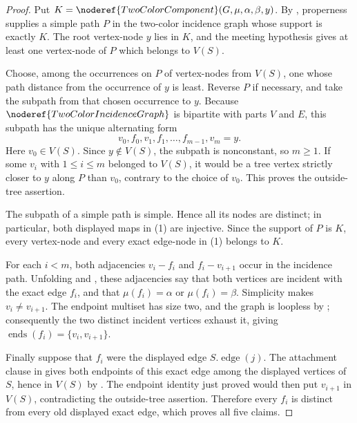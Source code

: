 \begin{proof}
Put
\(K=\noderef{TwoColorComponent}(G,\mu,\alpha,\beta,y)\).  By
, properness supplies a simple path
\(P\) in the two-color incidence graph whose support is exactly \(K\).
The root vertex-node \(y\) lies in \(K\), and the meeting hypothesis gives
at least one vertex-node of \(P\) which belongs to \(V(S)\).

Choose, among the occurrences on \(P\) of vertex-nodes from \(V(S)\), one
whose path distance from the occurrence of \(y\) is least.  Reverse \(P\)
if necessary, and take the subpath from that chosen occurrence to \(y\).
Because \(\noderef{TwoColorIncidenceGraph}\) is bipartite with parts \(V\)
and \(E\), this subpath has the unique alternating form
\[
 v_0,f_0,v_1,f_1,\ldots,f_{m-1},v_m=y.                 \tag{1}
\]
Here \(v_0\in V(S)\).  Since \(y\notin V(S)\), the subpath is nonconstant,
so \(m\geq1\).  If some \(v_i\) with \(1\leq i\leq m\) belonged to
\(V(S)\), it would be a tree vertex strictly closer to \(y\) along \(P\)
than \(v_0\), contrary to the choice of \(v_0\).  This proves the
outside-tree assertion.

The subpath of a simple path is simple.  Hence all its nodes are distinct;
in particular, both displayed maps in (1) are injective.  Since the support
of \(P\) is \(K\), every vertex-node and every exact edge-node in (1)
belongs to \(K\).

For each \(i<m\), both adjacencies
\(v_i\mathbin{-}f_i\) and \(f_i\mathbin{-}v_{i+1}\) occur in the incidence
path.  Unfolding  and
, these adjacencies say that both vertices are incident
with the exact edge \(f_i\), and that
\(\mu(f_i)=\alpha\) or \(\mu(f_i)=\beta\).  Simplicity makes
\(v_i\ne v_{i+1}\).  The endpoint multiset has size two, and the graph is
loopless by ; consequently the two distinct
incident vertices exhaust it, giving
\(\operatorname{ends}(f_i)=\{v_i,v_{i+1}\}\).

Finally suppose that \(f_i\) were the displayed edge \(S.\operatorname{edge}(j)\).
The attachment clause in  gives both endpoints of this
exact edge among the displayed vertices of \(S\), hence in \(V(S)\) by
.  The endpoint identity just proved would
then put \(v_{i+1}\) in \(V(S)\), contradicting the outside-tree assertion.
Therefore every \(f_i\) is distinct from every old displayed exact edge,
which proves all five claims.
\end{proof}
